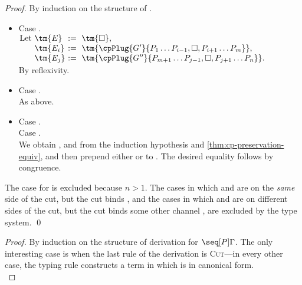 \documentclass[UKenglish]{llncs}
\begin{document}
\begin{subappendices}
  \begin{proof}
    By induction on the structure of .
    \begin{itemize}
    \item
      Case . 
      \\
      \(\arraycolsep=0pt\begin{array}[t]{lll}
        \text{Let}&\ \tm{E}  &\ :=\ \tm{\Box}, \\
                  &\ \tm{E_i}&\ :=\ \tm{\cpPlug{G'}{P_1\dots P_{i-1},\Box,P_{i+1}\dots P_m}}, \\
                  &\ \tm{E_j}&\ :=\ \tm{\cpPlug{G''}{P_{m+1}\dots P_{j-1},\Box,P_{j+1}\dots P_n}}.
      \end{array}\)
      \\[1ex]
      By reflexivity.
    \item
      Case .
      \\
      As above.
    \item
      Case . \\
      Case .
      \\
      We obtain ,  and  from the induction hypothesis and
      \cref{thm:cp-preservation-equiv}, and then prepend either
       or
       to .
      The desired equality follows by congruence.
    \end{itemize}
    The case for \tm{\Box} is excluded because $n > 1$.
    The cases in which  and  are on the \emph{same} side of the
    cut, but the cut binds , and the cases in which  and 
    are on different sides of the cut, but the cut binds some other channel
    , are excluded by the type system.
    \qed
  \end{proof}
  \thmcpprogress
  \begin{proof}
    By induction on the structure of derivation for $\seq[{ P }]{ \Gamma }$.
    The only interesting case is when the last rule of the derivation is
    \textsc{Cut}---in every other case, the typing rule constructs a term in
    which is in canonical form. 
    \\

\end{proof}
\end{subappendices}
\end{document}
